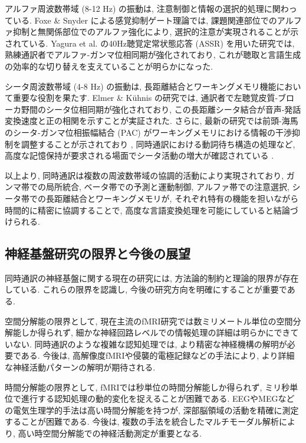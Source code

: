アルファ周波数帯域 (8-12 Hz) の振動は, 注意制御と情報の選択的処理に関わっている.
Foxe \& Snyder \cite{foxe2011} による感覚抑制ゲート理論では, 課題関連部位でのアルファ抑制と無関係部位でのアルファ強化により, 選択的注意が実現されることが示されている.
Yagura et al. \cite{yagura2021selective} の40Hz聴覚定常状態応答 (ASSR) を用いた研究では, 熟練通訳者でアルファ-ガンマ位相同期が強化されており, これが聴取と言語生成の効率的な切り替えを支えていることが明らかになった.

シータ周波数帯域 (4-8 Hz) の振動は, 長距離結合とワーキングメモリ機能において重要な役割を果たす.
Elmer \& Kühnis \cite{elmer2016functional} の研究では, 通訳者で左聴覚皮質-ブローカ野間のシータ位相同期が強化されており, この長距離シータ結合が音声-発話変換速度と正の相関を示すことが実証された.
さらに, 最新の研究では前頭-海馬のシータ-ガンマ位相振幅結合 (PAC) がワーキングメモリにおける情報の干渉抑制を調整することが示されており \cite{tgpac2024}, 同時通訳における動詞待ち構造の処理など, 高度な記憶保持が要求される場面でシータ活動の増大が確認されている \cite{wmalpha2024}.

以上より, 同時通訳は複数の周波数帯域の協調的活動により実現されており, ガンマ帯での局所統合, ベータ帯での予測と運動制御, アルファ帯での注意選択, シータ帯での長距離結合とワーキングメモリが, それぞれ特有の機能を担いながら時間的に精密に協調することで, 高度な言語変換処理を可能にしていると結論づけられる.

\subsection{神経基盤研究の限界と今後の展望}

同時通訳の神経基盤に関する現在の研究には, 方法論的制約と理論的限界が存在している.
これらの限界を認識し, 今後の研究方向を明確にすることが重要である.

空間分解能の限界として, 現在主流のfMRI研究では数ミリメートル単位の空間分解能しか得られず, 細かな神経回路レベルでの情報処理の詳細は明らかにできていない.
同時通訳のような複雑な認知処理では, より精密な神経機構の解明が必要である.
今後は, 高解像度fMRIや侵襲的電極記録などの手法により, より詳細な神経活動パターンの解明が期待される.

時間分解能の限界として, fMRIでは秒単位の時間分解能しか得られず, ミリ秒単位で進行する認知処理の動的変化を捉えることが困難である.
EEGやMEGなどの電気生理学的手法は高い時間分解能を持つが, 深部脳領域の活動を精確に測定することが困難である.
今後は, 複数の手法を統合したマルチモーダル解析により, 高い時空間分解能での神経活動測定が重要となる.

